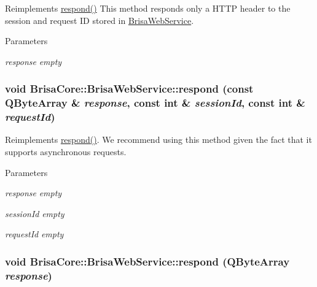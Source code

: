 Reimplements \hyperlink{classBrisaCore_1_1BrisaWebService_a4065f685234edf9f4c1bda00549060c7}{respond()} This method responds only a HTTP header to the session and request ID stored in \hyperlink{classBrisaCore_1_1BrisaWebService}{BrisaWebService}. 
\begin{DoxyParams}{Parameters}
\item[{\em response}]{\itshape empty\/} \end{DoxyParams}
\hypertarget{classBrisaCore_1_1BrisaWebService_ada638bec49ea1dcc3978120529265b60}{
\subsubsection[{respond}]{\setlength{\rightskip}{0pt plus 5cm}void BrisaCore::BrisaWebService::respond (const QByteArray \& {\em response}, \/  const int \& {\em sessionId}, \/  const int \& {\em requestId})}}
\label{classBrisaCore_1_1BrisaWebService_ada638bec49ea1dcc3978120529265b60}


Reimplements \hyperlink{classBrisaCore_1_1BrisaWebService_a4065f685234edf9f4c1bda00549060c7}{respond()}. We recommend using this method given the fact that it supports asynchronous requests.


\begin{DoxyParams}{Parameters}
\item[{\em response}]{\itshape empty\/} \item[{\em sessionId}]{\itshape empty\/} \item[{\em requestId}]{\itshape empty\/} \end{DoxyParams}
\hypertarget{classBrisaCore_1_1BrisaWebService_a4065f685234edf9f4c1bda00549060c7}{
\subsubsection[{respond}]{\setlength{\rightskip}{0pt plus 5cm}void BrisaCore::BrisaWebService::respond (QByteArray {\em response})}}
\label{classBrisaCore_1_1BrisaWebService_a4065f685234edf9f4c1bda00549060c7}


